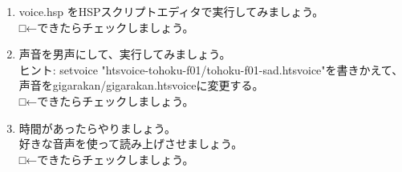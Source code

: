 \begin{tcolorbox}[title=\useOmetoi]
\begin{enumerate}
\item voice.hsp をHSPスクリプトエディタで実行してみましょう。\\□←できたらチェックしましょう。
\item 声音を男声にして、実行してみましょう。\\ヒント: setvoice "htsvoice-tohoku-f01/tohoku-f01-sad.htsvoice"を書きかえて、声音をgigarakan/gigarakan.htsvoiceに変更する。\\□←できたらチェックしましょう。
\item 時間があったらやりましょう。\\好きな音声を使って読み上げさせましょう。\\□←できたらチェックしましょう。
\end{enumerate}
\end{tcolorbox}